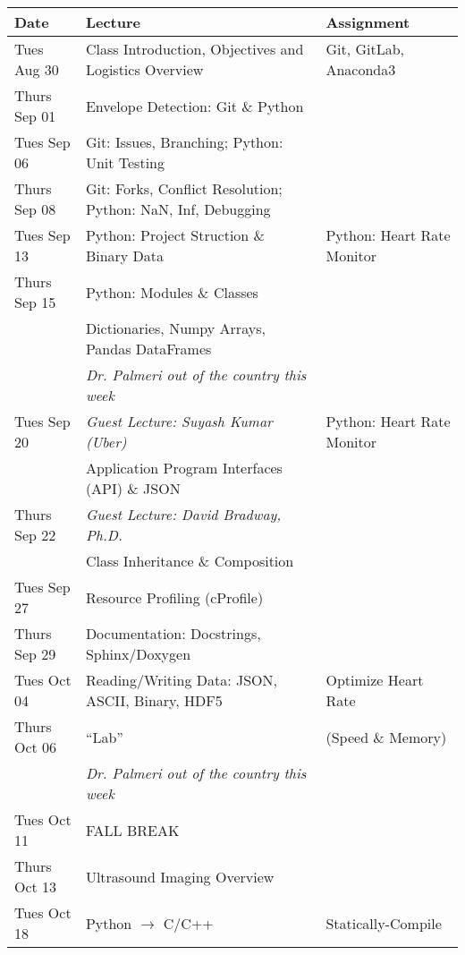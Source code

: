 \begin{longtable}[c]{|l|l|l|}

    \hline 
    
    \textbf{Date} & \textbf{Lecture} & \textbf{Assignment}\\

    \hline

    Tues Aug 30     & Class Introduction, Objectives and Logistics Overview & Git, GitLab, Anaconda3 \\
    Thurs Sep 01    & Envelope Detection: Git \& Python & \\
    \hline
    Tues Sep 06     & Git: Issues, Branching; Python: Unit Testing  & \\
    Thurs Sep 08    & Git: Forks, Conflict Resolution; Python: NaN, Inf, Debugging & \\
    \hline
    Tues Sep 13     & Python: Project Struction \& Binary Data & Python: Heart Rate Monitor \\
    Thurs Sep 15    & Python: Modules \& Classes & \\
                    & Dictionaries, Numpy Arrays, Pandas DataFrames & \\
    \hline
                    & \emph{Dr. Palmeri out of the country this week} & \\
    Tues Sep 20     & \emph{Guest Lecture: Suyash Kumar (Uber)} & Python: Heart Rate Monitor \\
                    & Application Program Interfaces (API) \& JSON & \\
    Thurs Sep 22    & \emph{Guest Lecture: David Bradway, Ph.D.} & \\
                    & Class Inheritance \& Composition & \\
    \hline
    Tues Sep 27    & Resource Profiling (cProfile) & \\
    Thurs Sep 29    & Documentation: Docstrings, Sphinx/Doxygen & \\
    \hline
    Tues Oct 04     & Reading/Writing Data: JSON, ASCII, Binary, HDF5 & Optimize Heart Rate \\
    Thurs Oct 06    & ``Lab'' & (Speed \& Memory) \\
    \hline
                    & \emph{Dr. Palmeri out of the country this week} & \\
    Tues Oct 11     & FALL BREAK & \\
    Thurs Oct 13    & Ultrasound Imaging Overview & \\
    \hline
    Tues Oct 18     & Python $\rightarrow$ C/C++ & Statically-Compile \\

\end{longtable}
